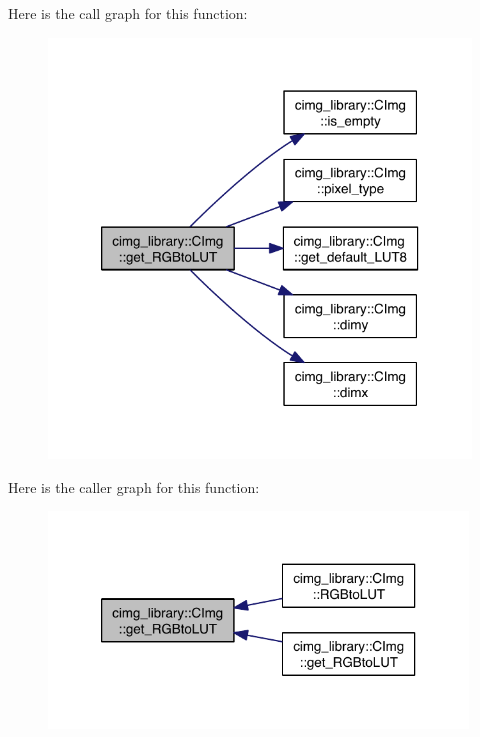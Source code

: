 Here is the call graph for this function\-:
\nopagebreak
\begin{figure}[H]
\begin{center}
\leavevmode
\includegraphics[width=318pt]{structcimg__library_1_1_c_img_ab2d6463804faab6dd4def4be68220d3b_cgraph}
\end{center}
\end{figure}




Here is the caller graph for this function\-:
\nopagebreak
\begin{figure}[H]
\begin{center}
\leavevmode
\includegraphics[width=316pt]{structcimg__library_1_1_c_img_ab2d6463804faab6dd4def4be68220d3b_icgraph}
\end{center}
\end{figure}


